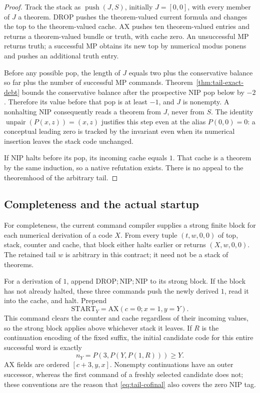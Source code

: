 \begin{proof}
Track the stack as $\operatorname{push}(J,S)$, initially $J=[0,0]$,
with every member of $J$ a theorem. DROP pushes the theorem-valued
current formula and changes the top to the theorem-valued cache.
AX pushes ten theorem-valued entries and returns a theorem-valued
bundle or truth, with cache zero. An unsuccessful MP returns truth;
a successful MP obtains its new top by numerical modus ponens and
pushes an additional truth entry.

Before any possible pop, the length of $J$ equals two plus the
conservative balance so far plus the number of successful MP commands.
Theorem~\ref{thm:tail-exact-debt} bounds the conservative balance after
the prospective NIP pop below by $-2$. Therefore its value before that
pop is at least $-1$, and $J$ is nonempty. A nonhalting NIP consequently
reads a theorem from $J$, never from $S$. The identity
$\operatorname{unpair}(P(x,z))=(x,z)$ justifies this step even at the
alias $P(0,0)=0$: a conceptual leading zero is tracked by the invariant
even when its numerical insertion leaves the stack code unchanged.

If NIP halts before its pop, its incoming cache equals $1$.
That cache is a theorem by the same induction, so a native refutation
exists. There is no appeal to the theoremhood of the arbitrary tail.
\end{proof}

\subsection{Completeness and the actual startup}

For completeness, the current command compiler supplies a strong
finite block for each numerical derivation of a code $X$. From every
tuple $(t,w,0,0)$ of top, stack, counter and cache, that block either
halts earlier or returns $(X,w,0,0)$. The retained tail $w$ is arbitrary
in this contract; it need not be a stack of theorems.

For a derivation of $1$, append $\mathrm{DROP};\mathrm{NIP};
\mathrm{NIP}$ to its strong block. If the block has not already halted,
these three commands push the newly derived $1$, read it into the cache,
and halt. Prepend
\[
 \mathrm{START}_Y=\mathrm{AX}(c=0;x=1,y=Y).
\]
This command clears the counter and cache regardless of their incoming
values, so the strong block applies above whichever stack it leaves.
If $R$ is the continuation encoding of the fixed suffix, the initial
candidate code for this entire successful word is exactly
\begin{equation}
 n_Y=P(3,P(Y,P(1,R)))\geq Y.
 \label{eq:tail-cofinal}
\end{equation}
AX fields are ordered $[c+3,y,x]$. Nonempty continuations have an outer
successor, whereas the first command of a freshly selected candidate
does not; these conventions are the reason that
\eqref{eq:tail-cofinal} also covers the zero NIP tag.

